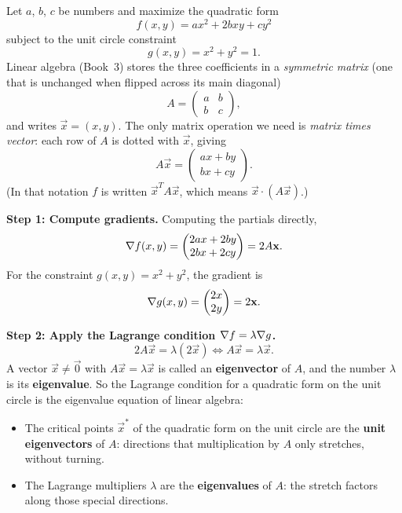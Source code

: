 \begin{example}
\label{ch33:ex-lagrange-eigenvalues}
Let $a$, $b$, $c$ be numbers and maximize the quadratic form
\[
f(x,y) = a x^2 + 2b xy + c y^2
\]
subject to the unit circle constraint
\[
g(x,y) = x^2 + y^2 = 1.
\]
Linear algebra (Book~3) stores the three coefficients in a \emph{symmetric
matrix} (one that is unchanged when flipped across its main diagonal)
\[
A = \begin{pmatrix} a & b \\ b & c \end{pmatrix},
\]
and writes $\vec x=(x,y)$. The only matrix operation we need is
\emph{matrix times vector}: each row of $A$ is dotted with $\vec x$, giving
\[
A\vec x = \begin{pmatrix} ax+by \\ bx+cy \end{pmatrix}.
\]
(In that notation $f$ is written $\vec x^{T}\!A\vec x$, which means
$\vec x\cdot(A\vec x)$.)

\textbf{Step 1: Compute gradients.}
Computing the partials directly,
\[
\nabla f(x,y) = \begin{pmatrix} 2ax + 2by \\ 2bx + 2cy \end{pmatrix} = 2 A \mathbf{x}.
\]
For the constraint $g(x,y) = x^2 + y^2$, the gradient is
\[
\nabla g(x,y) = \begin{pmatrix} 2x \\ 2y \end{pmatrix} = 2\mathbf{x}.
\]

\textbf{Step 2: Apply the Lagrange condition $\nabla f = \lambda \nabla g$.}
\[
2 A \vec{x} = \lambda (2 \vec{x}) \iff A \vec{x} = \lambda \vec{x}.
\]
A vector $\vec x\neq\vec 0$ with $A\vec x=\lambda\vec x$ is called an \textbf{eigenvector} of $A$, and the number $\lambda$ is its \textbf{eigenvalue}. So the Lagrange condition for a quadratic form on the unit circle is the eigenvalue equation of linear algebra:
\begin{itemize}
\item The critical points $\vec{x}^*$ of the quadratic form on the unit circle are the \textbf{unit eigenvectors} of $A$: directions that multiplication by $A$ only stretches, without turning.
\item The Lagrange multipliers $\lambda$ are the \textbf{eigenvalues} of $A$: the stretch factors along those special directions.
\end{itemize}


\end{example}
